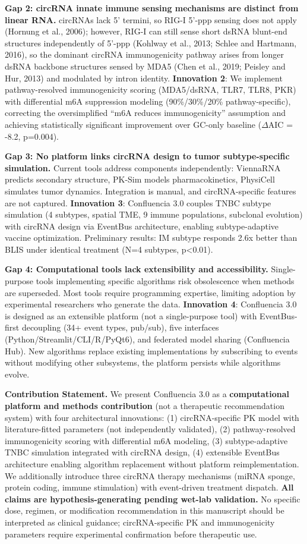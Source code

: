 \documentclass[12pt]{article}
\begin{document}
\textbf{Gap 2: circRNA innate immune sensing mechanisms are distinct from linear RNA.} circRNAs lack 5' termini, so RIG-I 5'-ppp sensing does not apply (Hornung et al., 2006); however, RIG-I can still sense short dsRNA blunt-end structures independently of 5'-ppp (Kohlway et al., 2013; Schlee and Hartmann, 2016), so the dominant circRNA immunogenicity pathway arises from longer dsRNA backbone structures sensed by MDA5 (Chen et al., 2019; Peisley and Hur, 2013) and modulated by intron identity. \textbf{Innovation 2}: We implement pathway-resolved immunogenicity scoring (MDA5/dsRNA, TLR7, TLR8, PKR) with differential m6A suppression modeling (90\%/30\%/20\% pathway-specific), correcting the oversimplified ``m6A reduces immunogenicity'' assumption and achieving statistically significant improvement over GC-only baseline ($\Delta$AIC = -8.2, p=0.004).

\textbf{Gap 3: No platform links circRNA design to tumor subtype-specific simulation.} Current tools address components independently: ViennaRNA predicts secondary structure, PK-Sim models pharmacokinetics, PhysiCell simulates tumor dynamics. Integration is manual, and circRNA-specific features are not captured. \textbf{Innovation 3}: Confluencia 3.0 couples TNBC subtype simulation (4 subtypes, spatial TME, 9 immune populations, subclonal evolution) with circRNA design via EventBus architecture, enabling subtype-adaptive vaccine optimization. Preliminary results: IM subtype responds 2.6x better than BLIS under identical treatment (N=4 subtypes, p<0.01).

\textbf{Gap 4: Computational tools lack extensibility and accessibility.} Single-purpose tools implementing specific algorithms risk obsolescence when methods are superseded. Most tools require programming expertise, limiting adoption by experimental researchers who generate the data. \textbf{Innovation 4}: Confluencia 3.0 is designed as an extensible platform (not a single-purpose tool) with EventBus-first decoupling (34+ event types, pub/sub), five interfaces (Python/Streamlit/CLI/R/PyQt6), and federated model sharing (Confluencia Hub). New algorithms replace existing implementations by subscribing to events without modifying other subsystems, the platform persists while algorithms evolve.

\textbf{Contribution Statement.} We present Confluencia 3.0 as a \textbf{computational platform and methods contribution} (not a therapeutic recommendation system) with four architectural innovations: (1) circRNA-specific PK model with literature-fitted parameters (not independently validated), (2) pathway-resolved immunogenicity scoring with differential m6A modeling, (3) subtype-adaptive TNBC simulation integrated with circRNA design, (4) extensible EventBus architecture enabling algorithm replacement without platform reimplementation. We additionally introduce three circRNA therapy mechanisms (miRNA sponge, protein coding, immune stimulation) with event-driven treatment dispatch. \textbf{All claims are hypothesis-generating pending wet-lab validation.} No specific dose, regimen, or modification recommendation in this manuscript should be interpreted as clinical guidance; circRNA-specific PK and immunogenicity parameters require experimental confirmation before therapeutic use.
\end{document}
